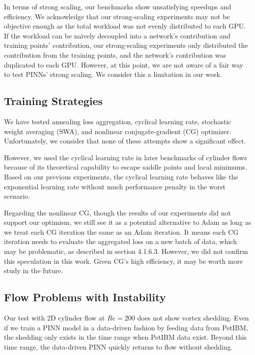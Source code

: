 In terms of strong scaling, our benchmarks show unsatisfying speedups and efficiency.
We acknowledge that our strong-scaling experiments may not be objective enough as the total workload was not evenly distributed to each GPU.
If the workload can be naively decoupled into a network's contribution and training points' contribution, our strong-scaling experiments only distributed the contribution from the training points, and the network's contribution was duplicated to each GPU.
However, at this point, we are not aware of a fair way to test PINNs' strong scaling.
We consider this a limitation in our work.

\subsection*{Training Strategies}

We have tested annealing loss aggregation, cyclical learning rate, stochastic weight averaging (SWA), and nonlinear conjugate-gradient (CG) optimizer.
Unfortunately, we consider that none of these attempts show a significant effect.

However, we used the cyclical learning rate in later benchmarks of cylinder flows because of its theoretical capability to escape saddle points and local minimums.
Based on our previous experiments, the cyclical learning rate behaves like the exponential learning rate without much performance penalty in the worst scenario.

Regarding the nonlinear CG, though the results of our experiments did not support our optimism, we still see it as a potential alternative to Adam as long as we treat each CG iteration the same as an Adam iteration.
It means each CG iteration needs to evaluate the aggregated loss on a new batch of data, which may be problematic, as described in section 4.1.6.3. 
However, we did not confirm this speculation in this work.
Given CG's high efficiency, it may be worth more study in the future.

\subsection*{Flow Problems with Instability}

Our test with 2D cylinder flow at $Re=200$ does not show vortex shedding. 
Even if we train a PINN model in a data-driven fashion by feeding data from PetIBM, the shedding only exists in the time range when PetIBM data exist.
Beyond this time range, the data-driven PINN quickly returns to flow without shedding.

